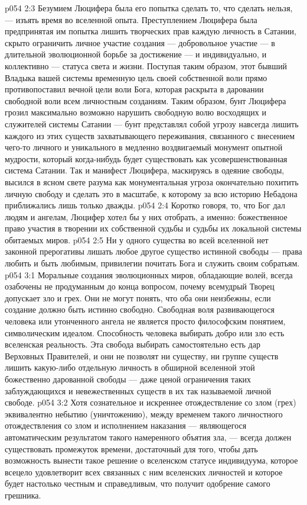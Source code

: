 \vs p054 2:3 \pc Безумием Люцифера была его попытка сделать то, что сделать нельзя, --- изъять время во вселенной опыта. Преступлением Люцифера была предпринятая им попытка лишить творческих прав каждую личность в Сатании, скрыто ограничить личное участие создания --- добровольное участие --- в длительной эволюционной борьбе за достижение --- и индивидуально, и коллективно --- статуса света и жизни. Поступая таким образом, этот бывший Владыка вашей системы временную цель своей собственной воли прямо противопоставил вечной цели воли Бога, которая раскрыта в даровании свободной воли всем личностным созданиям. Таким образом, бунт Люцифера грозил максимально возможно нарушить свободную волю восходящих и служителей системы Сатании --- бунт представлял собой угрозу навсегда лишить каждого из этих существ захватывающего переживания, связанного с внесением чего\hyp{}то личного и уникального в медленно воздвигаемый монумент опытной мудрости, который когда\hyp{}нибудь будет существовать как усовершенствованная система Сатании. Так и манифест Люцифера, маскируясь в одеяние свободы, высился в ясном свете разума как монументальная угроза окончательно похитить личную свободу и сделать это в масштабе, к которому за всю историю Небадона приближались лишь только дважды.
\vs p054 2:4 Коротко говоря, то, что Бог дал людям и ангелам, Люцифер хотел бы у них отобрать, а именно: божественное право участия в творении их собственной судьбы и судьбы их локальной системы обитаемых миров.
\vs p054 2:5 \pc Ни у одного существа во всей вселенной нет законной прерогативы лишать любое другое существо истинной свободы --- права любить и быть любимым, привилегии почитать Бога и служить своим собратьям.
\vs p054 3:1 Моральные создания эволюционных миров, обладающие волей, всегда озабочены не продуманным до конца вопросом, почему всемудрый Творец допускает зло и грех. Они не могут понять, что оба они неизбежны, если создание должно быть истинно свободно. Свободная воля развивающегося человека или утонченного ангела не является просто философским понятием, символическим идеалом. Способность человека выбирать добро или зло есть вселенская реальность. Эта свобода выбирать самостоятельно есть дар Верховных Правителей, и они не позволят ни существу, ни группе существ лишить какую\hyp{}либо отдельную личность в обширной вселенной этой божественно дарованной свободы --- даже ценой ограничения таких заблуждающихся и невежественных существ в их так называемой личной свободе.
\vs p054 3:2 Хотя сознательное и искреннее отождествление со злом (грех) эквивалентно небытию (уничтожению), между временем такого личностного отождествления со злом и исполнением наказания --- являющегося автоматическим результатом такого намеренного объятия зла, --- всегда должен существовать промежуток времени, достаточный для того, чтобы дать возможность вынести такое решение о вселенском статусе индивидуума, которое всецело удовлетворит всех связанных с ним вселенских личностей и которое будет настолько честным и справедливым, что получит одобрение самого грешника.

